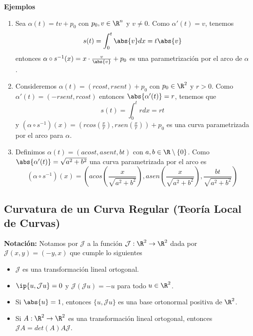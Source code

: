\documentclass{article}
\begin{document}
\noindent\textbf{Ejemplos}
\begin{enumerate}
    \item Sea $\alpha(t)=tv+p_{0}$ con $p_{0},v\in\R^{n}$ y $v\neq0$. Como $\alpha'(t)=v$, tenemos
    \begin{equation*}
        s(t)=\int_{0}^{t}\abs{v}dx=t\abs{v}
    \end{equation*}
    entonces $\alpha\circ s^{-1}(x)=x\cdot\frac{v}{\abs{v}}+p_{0}$ es una parametrización por el
    arco de $\alpha$.

    \item Consideremos $\alpha(t)=(rcost,rsent)+p_{0}$ con $p_{0}\in\R^{2}$ y $r>0$. Como 
    $\alpha'(t)=(-rsent,rcost)$ entonces $\abs{\alpha'(t)}=r$, tenemos que
    \begin{equation*}
        s(t)=\int_{0}^{t}rdx=rt
    \end{equation*}
    y $(\alpha\circ s^{-1})(x)=(rcos(\frac{x}{r}),rsen(\frac{x}{r}))+p_{0}$ es una curva 
    parametrizada por el arco para $\alpha$.

    \item Definimos $\alpha(t)=(acost,asent,bt)$ con $a,b\in\R\setminus\{0\}$. Como $\abs
    {\alpha'(t)}=\sqrt{a^{2}+b^{2}}$ una curva parametrizada por el arco es
    \begin{equation*}
        (\alpha\circ s^{-1})(x)=\left(acos\left(\frac{x}{\sqrt{a^{2}+b^{2}}}\right),
        asen\left(\frac{x}{\sqrt{a^{2}+b^{2}}}\right),\frac{bt}{\sqrt{a^{2}+b^{2}}}\right)
    \end{equation*}
\end{enumerate}

\subsection{Curvatura de un Curva Regular (Teoría Local de Curvas)}

\noindent\textbf{Notación:} Notamos por $\mathcal{J}$ a la función $\mathcal{J}:\R^{2}\to\R^{2}$
dada por $\mathcal{J}(x,y)=(-y,x)$ que cumple lo siguientes

\begin{itemize}
    \item $\mathcal{J}$ es una transformación lineal ortogonal.
    \item $\ip{u,\mathcal{J}u}=0$ y $\mathcal{J}(\mathcal{J}u)=-u$ para todo $u\in\R^{2}$.
    \item Si $\abs{u}=1$, entonces $\{u,\mathcal{J}u\}$ es una base ortonormal positiva de 
    $\R^{2}$.
    \item Si $A:\R^{2}\to\R^{2}$ es una transformación lineal ortogonal, entonces 
    $\mathcal{J}A=det(A)A\mathcal{J}$.
\end{itemize}
\end{document}
